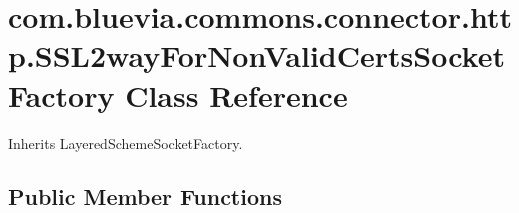 \hypertarget{classcom_1_1bluevia_1_1commons_1_1connector_1_1http_1_1SSL2wayForNonValidCertsSocketFactory}{
\section{com.bluevia.commons.connector.http.SSL2wayForNonValidCertsSocketFactory Class Reference}
\label{classcom_1_1bluevia_1_1commons_1_1connector_1_1http_1_1SSL2wayForNonValidCertsSocketFactory}
}


Inherits LayeredSchemeSocketFactory.

\subsection*{Public Member Functions}
